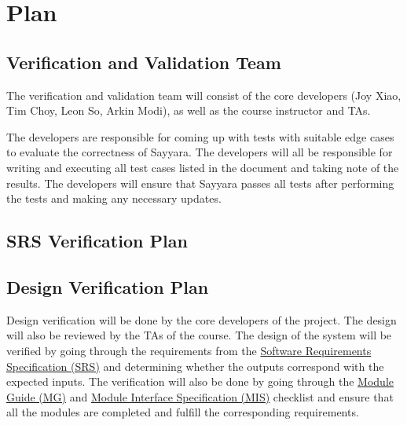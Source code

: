 \documentclass[12pt, titlepage]{article}
\begin{document}
\citet{SRS}

\section{Plan}


\subsection{Verification and Validation Team}

The verification and validation team will consist of the core developers (Joy Xiao, Tim Choy, Leon
So, Arkin Modi), as well as the course instructor and TAs.

The developers are responsible for coming up with tests with suitable edge cases to evaluate the
correctness of Sayyara. The developers will all be responsible for writing and executing all test
cases listed in the document and taking note of the results. The developers will ensure that
Sayyara passes all tests after performing the tests and making any necessary updates.

\subsection{SRS Verification Plan}



\subsection{Design Verification Plan}

Design verification will be done by the core developers of the project. The design will also be
reviewed by the TAs of the course. The design of the system will be verified by going through the
requirements from the
\href{https://github.com/arkinmodi/project-sayyara/blob/main/docs/SRS/SRS.pdf}{Software
	Requirements Specification (SRS)} and determining whether the outputs correspond with the expected
inputs. The verification will also be done by going through the
\href{https://github.com/arkinmodi/project-sayyara/blob/main/docs/Design/MG/MG.pdf}{Module Guide
	(MG)} and
\href{https://github.com/arkinmodi/project-sayyara/blob/main/docs/Design/MIS/MIS.pdf}{Module
	Interface Specification (MIS)} checklist and ensure that all the modules are completed and fulfill
the corresponding requirements.
\end{document}
